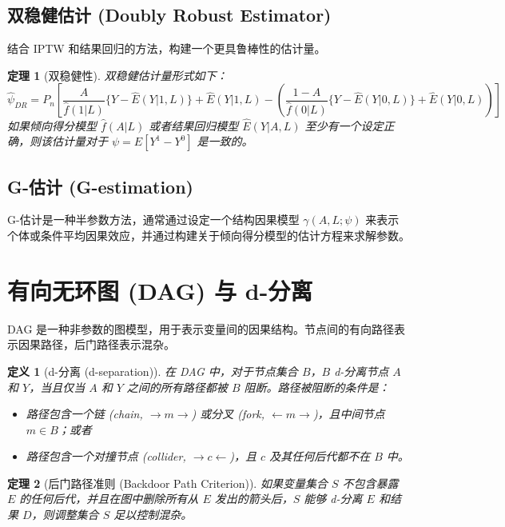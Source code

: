 \documentclass[UTF8]{ctexart}
\newtheorem{theorem}{定理}
\newtheorem{definition}{定义}
\begin{document}
\subsection{双稳健估计 (Doubly Robust Estimator)}
结合 IPTW 和结果回归的方法，构建一个更具鲁棒性的估计量。
\begin{theorem}[双稳健性]
双稳健估计量形式如下：
$$ \hat{\psi}_{DR} = P_n \left[ \frac{A}{\hat{f}(1|L)} \{Y - \hat{E}(Y|1, L)\} + \hat{E}(Y|1, L) - \left( \frac{1 - A}{\hat{f}(0|L)} \{Y - \hat{E}(Y|0, L)\} + \hat{E}(Y|0, L) \right) \right] $$
如果倾向得分模型 $\hat{f}(A|L)$ 或者结果回归模型 $\hat{E}(Y|A, L)$ 至少有一个设定正确，则该估计量对于 $\psi = E[Y^1 - Y^0]$ 是一致的。
\end{theorem}

\subsection{G-估计 (G-estimation)}
G-估计是一种半参数方法，通常通过设定一个结构因果模型 $\gamma(A, L; \psi)$ 来表示个体或条件平均因果效应，并通过构建关于倾向得分模型的估计方程来求解参数。

\section{有向无环图 (DAG) 与 d-分离}
DAG 是一种非参数的图模型，用于表示变量间的因果结构。节点间的有向路径表示因果路径，后门路径表示混杂。

\begin{definition}[d-分离 (d-separation)]
在 DAG 中，对于节点集合 $B$，$B$ d-分离节点 $A$ 和 $Y$，当且仅当 $A$ 和 $Y$ 之间的所有路径都被 $B$ 阻断。路径被阻断的条件是：
\begin{itemize}
    \item 路径包含一个链 (chain, $\rightarrow m \rightarrow$) 或分叉 (fork, $\leftarrow m \rightarrow$)，且中间节点 $m \in B$；或者
    \item 路径包含一个对撞节点 (collider, $\rightarrow c \leftarrow$)，且 $c$ 及其任何后代都不在 $B$ 中。
\end{itemize}
\end{definition}

\begin{theorem}[后门路径准则 (Backdoor Path Criterion)]
如果变量集合 $S$ 不包含暴露 $E$ 的任何后代，并且在图中删除所有从 $E$ 发出的箭头后，$S$ 能够 d-分离 $E$ 和结果 $D$，则调整集合 $S$ 足以控制混杂。
\end{theorem}
\end{document}
